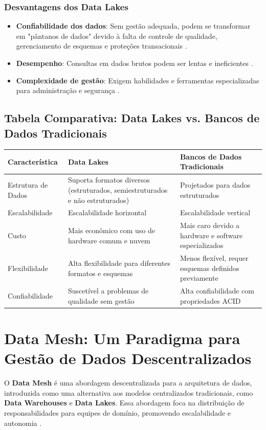 \subsubsection*{Desvantagens dos Data Lakes}
\begin{itemize}
    \item \textbf{Confiabilidade dos dados}: Sem gestão adequada, podem se transformar em "pântanos de dados" devido à falta de controle de qualidade, gerenciamento de esquemas e proteções transacionais \cite{Architecting_data_lake_houses}.
    \item \textbf{Desempenho}: Consultas em dados brutos podem ser lentas e ineficientes \cite{Architecting_data_lake_houses}.
    \item \textbf{Complexidade de gestão}: Exigem habilidades e ferramentas especializadas para administração e segurança \cite{Architecting_data_lake_houses}.
\end{itemize}


\subsection{Tabela Comparativa: Data Lakes vs. Bancos de Dados Tradicionais}

\begin{tabular}{|p{4cm}|p{6cm}|p{6cm}|}
    \hline
    \textbf{Característica} & \textbf{Data Lakes} & \textbf{Bancos de Dados Tradicionais} \\ \hline
    Estrutura de Dados & Suporta formatos diversos (estruturados, semiestruturados e não estruturados) & Projetados para dados estruturados \\ \hline
    Escalabilidade & Escalabilidade horizontal & Escalabilidade vertical \\ \hline
    Custo & Mais econômico com uso de hardware comum e nuvem & Mais caro devido a hardware e software especializados \\ \hline
    Flexibilidade & Alta flexibilidade para diferentes formatos e esquemas & Menos flexível, requer esquemas definidos previamente \\ \hline
    Confiabilidade & Suscetível a problemas de qualidade sem gestão & Alta confiabilidade com propriedades ACID \\ \hline
\end{tabular}


\section{Data Mesh: Um Paradigma para Gestão de Dados Descentralizados}
O \textbf{Data Mesh} é uma abordagem descentralizada para a arquitetura de dados, introduzida como uma alternativa aos modelos centralizados tradicionais, como \textbf{Data Warehouses} e \textbf{Data Lakes}. Essa abordagem foca na distribuição de responsabilidades para equipes de domínio, promovendo escalabilidade e autonomia \cite{dehghani2020data}. 

